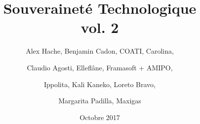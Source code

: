 \title{Souveraineté Technologique\\ vol. 2}
\author{
	Alex Hache, Benjamin Cadon, COATI, Carolina, \and 
	Claudio Agosti, Elleflâne, Framasoft + AMIPO, \and
	Ippolita, Kali Kaneko, Loreto Bravo,\and
	Margarita Padilla, Maxigas } 
\date{Octobre 2017}
